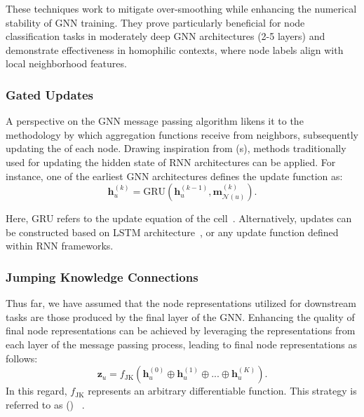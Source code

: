 These techniques work to mitigate over-smoothing while enhancing the numerical stability of GNN training. They prove particularly beneficial for node classification tasks in moderately deep GNN architectures (2-5 layers) and demonstrate effectiveness in homophilic contexts, where node labels align with local neighborhood features.

\subsubsection{Gated Updates}
A perspective on the GNN message passing algorithm likens it to the methodology by which aggregation functions receive  from neighbors, subsequently updating the  of each node. Drawing inspiration from  (s), methods traditionally used for updating the hidden state of RNN architectures can be applied. For instance, one of the earliest GNN architectures defines the update function as:
\begin{equation*}
    \mathbf{h}_u^{(k)} = \text{GRU}(\mathbf{h}_u^{(k-1)}, \mathbf{m}_{\mathcal{N}(u)}^{(k)}).
\end{equation*}

Here, GRU refers to the update equation of the  cell~\cite{Cho2014learningPhraseRepresentations}. Alternatively, updates can be constructed based on LSTM architecture~\cite{selsam2018LearningSATSolverSingleBitSupervision}, or any update function defined within RNN frameworks.

\subsubsection{Jumping Knowledge Connections}
Thus far, we have assumed that the node representations utilized for downstream tasks are those produced by the final layer of the GNN. Enhancing the quality of final node representations can be achieved by leveraging the representations from each layer of the message passing process, leading to final node representations as follows:
\begin{equation*}
    \mathbf{z}_u = f_\text{JK}(\mathbf{h}_u^{(0)} \oplus \mathbf{h}_u^{(1)} \oplus ... \oplus \mathbf{h}_u^{(K)}).
\end{equation*}
In this regard, $ f_\text{JK} $ represents an arbitrary differentiable function. This strategy is referred to as  () ~\cite{xu2018RepresentationLearningGraphsJumpingKnowledgeNetworks}.

